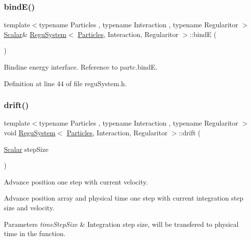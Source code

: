 \subsubsection{\texorpdfstring{bind\+E()}{bindE()}}
{\footnotesize\ttfamily template$<$typename Particles , typename Interaction , typename Regularitor $>$ \\
\mbox{\hyperlink{class_regu_system_afa2cfdbfed4cc8fa879ca715c78ff240}{Scalar}}\& \mbox{\hyperlink{class_regu_system}{Regu\+System}}$<$ \mbox{\hyperlink{struct_particles}{Particles}}, Interaction, Regularitor $>$\+::bindE (\begin{DoxyParamCaption}{ }\end{DoxyParamCaption})\hspace{0.3cm}{\ttfamily [inline]}}



Bindine energy interface. Reference to partc.\+bindE. 



Definition at line 44 of file regu\+System.\+h.

\mbox{\label{class_regu_system_aa7566794cc669e07eff8f42cfafee6c2}} 
\subsubsection{\texorpdfstring{drift()}{drift()}}
{\footnotesize\ttfamily template$<$typename Particles , typename Interaction , typename Regularitor $>$ \\
void \mbox{\hyperlink{class_regu_system}{Regu\+System}}$<$ \mbox{\hyperlink{struct_particles}{Particles}}, Interaction, Regularitor $>$\+::drift (\begin{DoxyParamCaption}\item[{\mbox{\hyperlink{class_regu_system_afa2cfdbfed4cc8fa879ca715c78ff240}{Scalar}}}]{step\+Size }\end{DoxyParamCaption})\hspace{0.3cm}{\ttfamily [inline]}}



Advance position one step with current velocity. 

Advance position array and physical time one step with current integration step size and velocity. 
\begin{DoxyParams}{Parameters}
{\em time\+Step\+Size} & Integration step size, will be transfered to physical time in the function. \\
\hline
\end{DoxyParams}


